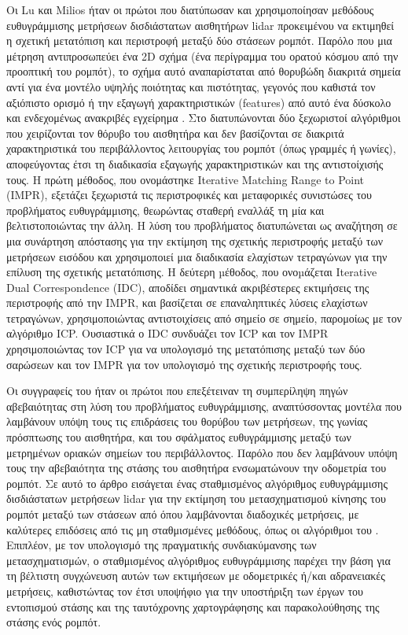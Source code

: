 Οι Lu και Milios ήταν οι πρώτοι που διατύπωσαν και χρησιμοποίησαν μεθόδους
ευθυγράμμισης μετρήσεων δισδιάστατων αισθητήρων lidar προκειμένου να εκτιμηθεί
η σχετική μετατόπιση και περιστροφή μεταξύ δύο στάσεων ρομπότ. Παρόλο που μια
μέτρηση αντιπροσωπεύει ένα 2D σχήμα (ένα περίγραμμα του ορατού κόσμου από την
προοπτική του ρομπότ), το σχήμα αυτό αναπαρίσταται από θορυβώδη διακριτά σημεία
αντί για ένα μοντέλο υψηλής ποιότητας και πιστότητας, γεγονός που καθιστά τον
αξιόπιστο ορισμό ή την εξαγωγή χαρακτηριστικών (features) από αυτό ένα δύσκολο
και ενδεχομένως ανακριβές εγχείρημα \cite{Grimson}. Στο \cite{FengLu1994a}
διατυπώνονται δύο ξεχωριστοί αλγόριθμοι που χειρίζονται τον θόρυβο του
αισθητήρα και δεν βασίζονται σε διακριτά χαρακτηριστικά του περιβάλλοντος
λειτουργίας του ρομπότ (όπως γραμμές ή γωνίες), αποφεύγοντας έτσι τη διαδικασία
εξαγωγής χαρακτηριστικών και της αντιστοίχισής τους. Η πρώτη μέθοδος, που
ονομάστηκε Iterative Matching Range to Point (IMPR), εξετάζει ξεχωριστά τις
περιστροφικές και μεταφορικές συνιστώσες του προβλήματος ευθυγράμμισης,
θεωρώντας σταθερή εναλλάξ τη μία και βελτιστοποιώντας την άλλη. Η λύση του
προβλήματος διατυπώνεται ως αναζήτηση σε μια συνάρτηση απόστασης για την
εκτίμηση της σχετικής περιστροφής μεταξύ των μετρήσεων εισόδου και χρησιμοποιεί
μια διαδικασία ελαχίστων τετραγώνων για την επίλυση της σχετικής μετατόπισης. Η
δεύτερη µέθοδος, που ονοµάζεται Iterative Dual Correspondence (IDC), αποδίδει
σημαντικά ακριβέστερες εκτιμήσεις της περιστροφής από την IMPR, και βασίζεται
σε επαναληπτικές λύσεις ελαχίστων τετραγώνων, χρησιμοποιώντας αντιστοιχίσεις
από σημείο σε σημείο, παρομοίως με τον αλγόριθμο ICP. Ουσιαστικά ο IDC
συνδυάζει τον ICP και τον IMPR χρησιμοποιώντας τον ICP για να υπολογισμό της
μετατόπισης μεταξύ των δύο σαρώσεων και τον IMPR για τον υπολογισμό της
σχετικής περιστροφής τους.

Οι συγγραφείς του \cite{Pfistera} ήταν οι πρώτοι που επεξέτειναν τη συμπερίληψη
πηγών αβεβαιότητας στη λύση του προβλήματος ευθυγράμμισης, αναπτύσσοντας
μοντέλα που λαμβάνουν υπόψη τους τις επιδράσεις του θορύβου των μετρήσεων, της
γωνίας πρόσπτωσης του αισθητήρα, και του σφάλματος ευθυγράμμισης μεταξύ των
μετρημένων οριακών σημείων του περιβάλλοντος. Παρόλο που δεν λαμβάνουν υπόψη
τους την αβεβαιότητα της στάσης του αισθητήρα ενσωματώνουν την οδομετρία του
ρομπότ. Σε αυτό το άρθρο εισάγεται ένας σταθμισμένος αλγόριθμος ευθυγράμμισης
δισδιάστατων μετρήσεων lidar για την εκτίμηση του μετασχηματισμού
κίνησης του ρομπότ μεταξύ των στάσεων από όπου λαμβάνονται διαδοχικές
μετρήσεις, με καλύτερες επιδόσεις από τις μη σταθμισμένες μεθόδους, όπως οι
αλγόριθμοι του \cite{FengLu1994a}.  Επιπλέον, με τον υπολογισμό της πραγματικής
συνδιακύμανσης των μετασχηματισμών, ο σταθμισμένος αλγόριθμος ευθυγράμμισης
παρέχει την βάση για τη βέλτιστη συγχώνευση αυτών των εκτιμήσεων με οδομετρικές
ή/και αδρανειακές μετρήσεις, καθιστώντας τον έτσι υποψήφιο για την υποστήριξη
των έργων του εντοπισμού στάσης και της ταυτόχρονης χαρτογράφησης και
παρακολούθησης της στάσης ενός ρομπότ.


